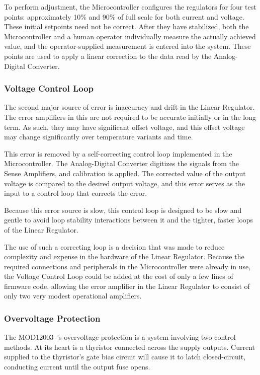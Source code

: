 \documentclass[a4paper,twocolumn,10pt,openany,oneside,final,fleqn]{memoir}
\newcommand{\Model}{MOD12003\ }
\begin{document}
To perform adjustment, the Microcontroller configures the regulators for four test points:
approximately 10\% and 90\% of full scale for both current and voltage. These initial
setpoints need not be correct. After they have stabilized, both the Microcontroller and
a human operator individually measure the actually achieved value, and the operator-supplied
measurement is entered into the system. These points are used to apply a linear correction
to the data read by the Analog-Digital Converter.

\subsubsection{Voltage Control Loop}

The second major source of error is inaccuracy and drift in the Linear Regulator.
The error amplifiers in this are not required to be accurate initially or in the long
term. As such, they may have significant offset voltage, and this offset voltage may
change significantly over temperature variants and time.

This error is removed by a self-correcting control loop implemented in the Microcontroller.
The Analog-Digital Converter digitizes the signals from the Sense Amplifiers, and calibration
is applied. The corrected value of the output voltage is compared to the desired output
voltage, and this error serves as the input to a control loop that corrects the error.

Because this error source is slow, this control loop is designed to be slow and gentle
to avoid loop stability interactions between it and the tighter, faster loops of the
Linear Regulator.

The use of such a correcting loop is a decision that was made to reduce complexity
and expense in the hardware of the Linear Regulator. Because the required connections
and peripherals in the Microcontroller were already in use, the Voltage Control Loop could
be added at the cost of only a few lines of firmware code, allowing the error amplifier
in the Linear Regulator to consist of only two very modest operational amplifiers.

\subsubsection{Overvoltage Protection}

The \Model's overvoltage protection is a system involving two
control methods. At its heart is a thyristor connected across the supply outputs.
Current supplied to the thyristor's gate bias circuit will cause it to
latch closed-circuit, conducting current until the output fuse opens.
\end{document}
